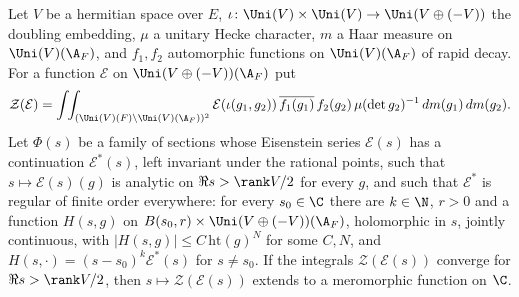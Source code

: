 \begin{lemma}\label{pf:bundles:lem:zetacont}
Let $V$ be a hermitian space over $E$, $\iota\colon\Uni(V)\times\Uni(V)\to\Uni(V\oplus(-V))$ the doubling embedding, $\mu$ a unitary
Hecke character, $m$ a Haar measure on $\Uni(V)(\A_F)$, and $f_1,f_2$ automorphic functions on $\Uni(V)(\A_F)$ of rapid decay. For a
function $\mathcal E$ on $\Uni(V\oplus(-V))(\A_F)$ put
\[
\mathcal Z(\mathcal E)=\int\!\!\int_{(\Uni(V)(F)\backslash\Uni(V)(\A_F))^2}\mathcal E(\iota(g_1,g_2))\,\overline{f_1(g_1)}\,f_2(g_2)\,
\mu(\det g_2)^{-1}\,dm(g_1)\,dm(g_2).
\]
Let $\Phi(s)$ be a family of sections whose Eisenstein series $\mathcal E(s)$ has a continuation $\mathcal E^*(s)$, left invariant
under the rational points, such that $s\mapsto\mathcal E(s)(g)$ is analytic on $\Re s>\rank V/2$ for every $g$, and such that
$\mathcal E^*$ is regular of finite order everywhere: for every $s_0\in\C$ there are $k\in\N$, $r>0$ and a function $H(s,g)$ on
$B(s_0,r)\times\Uni(V\oplus(-V))(\A_F)$, holomorphic in $s$, jointly continuous, with $|H(s,g)|\le C\,\mathrm{ht}(g)^N$ for some $C,N$,
and $H(s,\cdot)=(s-s_0)^k\mathcal E^*(s)$ for $s\neq s_0$. If the integrals $\mathcal Z(\mathcal E(s))$ converge for $\Re s>\rank V/2$,
then $s\mapsto\mathcal Z(\mathcal E(s))$ extends to a meromorphic function on $\C$.
\end{lemma}


